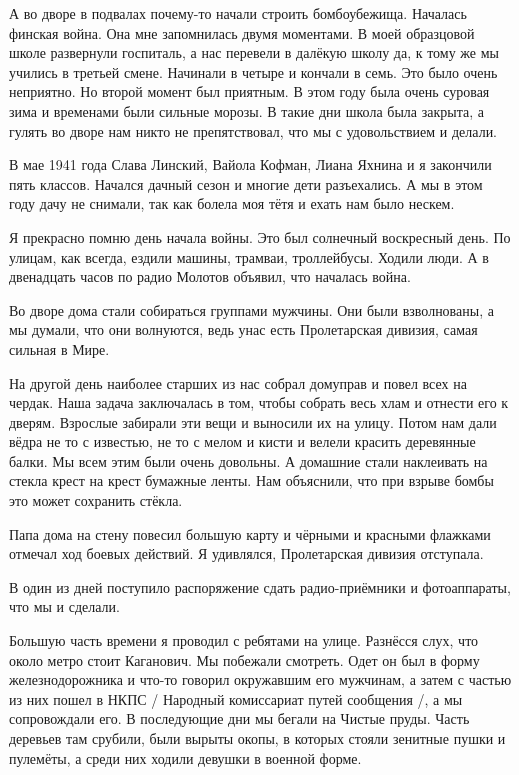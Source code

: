 А во дворе в подвалах почему-то начали строить бомбоубежища. Началась финская война. Она мне запомнилась двумя моментами. В моей образцовой школе развернули госпиталь, а нас перевели в далёкую школу да, к тому же мы учились в третьей смене. Начинали в четыре и кончали в семь. Это было очень неприятно. Но второй момент был приятным. В этом году была очень суровая зима и временами были сильные морозы. В такие дни школа была закрыта, а гулять во дворе нам никто не препятствовал, что мы с удовольствием и делали.

В мае 1941 года Слава Линский, Вайола Кофман, Лиана Яхнина и я закончили пять классов. Начался дачный сезон и многие дети разъехались. А мы в этом году дачу не снимали, так как болела моя тётя и ехать нам было нескем.

Я прекрасно помню день начала войны. Это был солнечный воскресный день. По улицам, как всегда, ездили машины, трамваи, троллейбусы. Ходили люди. А в двенадцать часов по радио Молотов объявил, что началась война.

Во дворе дома стали собираться группами мужчины. Они были взволнованы, а мы думали, что они волнуются, ведь унас есть Пролетарская дивизия, самая сильная в Мире.

На другой день наиболее старших из нас собрал домуправ и повел всех на чердак. Наша задача заключалась в том, чтобы собрать весь хлам и отнести его к дверям. Взрослые забирали эти вещи и выносили их на улицу. Потом нам дали вёдра не то с известью, не то с мелом и кисти и велели красить деревянные балки. Мы всем этим были очень довольны. А домашние стали наклеивать на стекла крест на крест бумажные ленты. Нам объяснили, что при взрыве бомбы это может сохранить стёкла.

Папа дома на стену повесил большую карту и чёрными и красными флажками отмечал ход боевых действий. Я удивлялся, Пролетарская дивизия отступала.

В один из дней поступило распоряжение сдать радио-приёмники и фотоаппараты, что мы и сделали.

Большую часть времени я проводил с ребятами на улице. Разнёсся слух, что около метро стоит Каганович. Мы побежали смотреть. Одет он был в форму железнодорожника и что-то говорил окружавшим его мужчинам, а затем с частью из них пошел в НКПС / Народный комиссариат путей сообщения /, а мы сопровождали его. В последующие дни мы бегали на Чистые пруды. Часть деревьев там срубили, были вырыты окопы, в которых стояли зенитные пушки и пулемёты, а среди них ходили девушки в военной форме.

